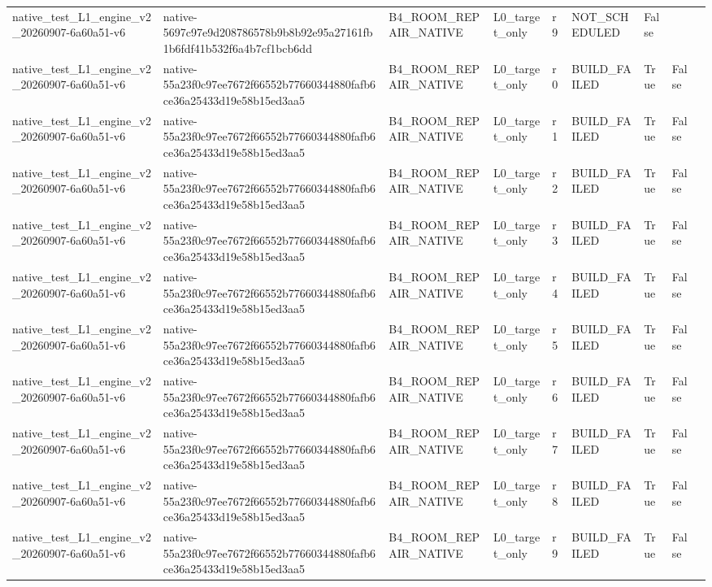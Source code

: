 \begin{tabular}{lllllllll}
native\_test\_L1\_engine\_v2\_20260907-6a60a51-v6 & native-5697c97e9d208786578b9b8b92e95a27161fb1b6fdf41b532f6a4b7cf1bcb6dd & B4\_ROOM\_REPAIR\_NATIVE & L0\_target\_only & r9 & NOT\_SCHEDULED & False &  &  \\
native\_test\_L1\_engine\_v2\_20260907-6a60a51-v6 & native-55a23f0c97ee7672f66552b77660344880fafb6ce36a25433d19e58b15ed3aa5 & B4\_ROOM\_REPAIR\_NATIVE & L0\_target\_only & r0 & BUILD\_FAILED & True & False &  \\
native\_test\_L1\_engine\_v2\_20260907-6a60a51-v6 & native-55a23f0c97ee7672f66552b77660344880fafb6ce36a25433d19e58b15ed3aa5 & B4\_ROOM\_REPAIR\_NATIVE & L0\_target\_only & r1 & BUILD\_FAILED & True & False &  \\
native\_test\_L1\_engine\_v2\_20260907-6a60a51-v6 & native-55a23f0c97ee7672f66552b77660344880fafb6ce36a25433d19e58b15ed3aa5 & B4\_ROOM\_REPAIR\_NATIVE & L0\_target\_only & r2 & BUILD\_FAILED & True & False &  \\
native\_test\_L1\_engine\_v2\_20260907-6a60a51-v6 & native-55a23f0c97ee7672f66552b77660344880fafb6ce36a25433d19e58b15ed3aa5 & B4\_ROOM\_REPAIR\_NATIVE & L0\_target\_only & r3 & BUILD\_FAILED & True & False &  \\
native\_test\_L1\_engine\_v2\_20260907-6a60a51-v6 & native-55a23f0c97ee7672f66552b77660344880fafb6ce36a25433d19e58b15ed3aa5 & B4\_ROOM\_REPAIR\_NATIVE & L0\_target\_only & r4 & BUILD\_FAILED & True & False &  \\
native\_test\_L1\_engine\_v2\_20260907-6a60a51-v6 & native-55a23f0c97ee7672f66552b77660344880fafb6ce36a25433d19e58b15ed3aa5 & B4\_ROOM\_REPAIR\_NATIVE & L0\_target\_only & r5 & BUILD\_FAILED & True & False &  \\
native\_test\_L1\_engine\_v2\_20260907-6a60a51-v6 & native-55a23f0c97ee7672f66552b77660344880fafb6ce36a25433d19e58b15ed3aa5 & B4\_ROOM\_REPAIR\_NATIVE & L0\_target\_only & r6 & BUILD\_FAILED & True & False &  \\
native\_test\_L1\_engine\_v2\_20260907-6a60a51-v6 & native-55a23f0c97ee7672f66552b77660344880fafb6ce36a25433d19e58b15ed3aa5 & B4\_ROOM\_REPAIR\_NATIVE & L0\_target\_only & r7 & BUILD\_FAILED & True & False &  \\
native\_test\_L1\_engine\_v2\_20260907-6a60a51-v6 & native-55a23f0c97ee7672f66552b77660344880fafb6ce36a25433d19e58b15ed3aa5 & B4\_ROOM\_REPAIR\_NATIVE & L0\_target\_only & r8 & BUILD\_FAILED & True & False &  \\
native\_test\_L1\_engine\_v2\_20260907-6a60a51-v6 & native-55a23f0c97ee7672f66552b77660344880fafb6ce36a25433d19e58b15ed3aa5 & B4\_ROOM\_REPAIR\_NATIVE & L0\_target\_only & r9 & BUILD\_FAILED & True & False &  \\

\end{tabular}
